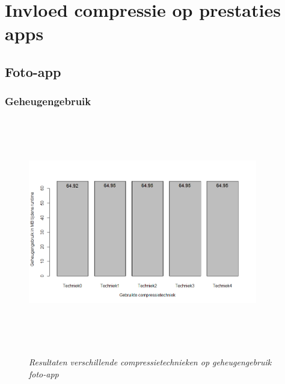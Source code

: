 \section{Invloed compressie op prestaties apps}
\label{sec:invloedcompressie}
\subsection{Foto-app}
\subsubsection{Geheugengebruik}
\begin{figure}[H]
	\centering
	\caption{\textit{Resultaten verschillende compressietechnieken op geheugengebruik foto-app}}
	\includegraphics[width=10cm, height=10cm, keepaspectratio]{img/Rplot03}\\[.5cm]
	
\end{figure}

